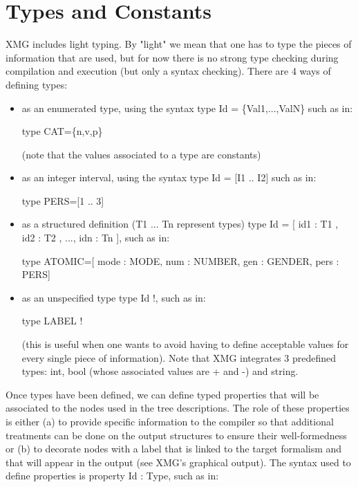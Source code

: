 \documentclass[11pt,fleqn]{book} %
\begin{document}
\section{Types and Constants}
XMG includes light typing. By "light" we mean that one has to type the pieces of information that are used, but for now there is no strong type checking during compilation and execution (but only a syntax checking). There are 4 ways of defining types:

\begin{itemize}
\item    as an enumerated type, using the syntax type Id = \{Val1,...,ValN\} such as in: 
\begin{theorem}
type CAT=\{n,v,p\}
\end{theorem}

(note that the values associated to a type are constants)

\item    as an integer interval, using the syntax type Id = [I1 .. I2] such as in: 
\begin{theorem}
type PERS=[1 .. 3]
\end{theorem}

\item    as a structured definition (T1 ... Tn represent types) type Id = [ id1 : T1 , id2 : T2 , ..., idn : Tn ], such as in: 
\begin{theorem}
type ATOMIC=[
     mode : MODE,
     num : NUMBER,
     gen : GENDER,
     pers : PERS]
\end{theorem}

\item    as an unspecified type type Id !, such as in: 
\begin{theorem}
type LABEL !
\end{theorem}

(this is useful when one wants to avoid having to define acceptable values for every single piece of information). Note that XMG integrates 3 predefined types: int, bool (whose associated values are + and -) and string.
\end{itemize}
Once types have been defined, we can define typed properties that will be associated to the nodes used in the tree descriptions. The role of these properties is either (a) to provide specific information to the compiler so that additional treatments can be done on the output structures to ensure their well-formedness or (b) to decorate nodes with a label that is linked to the target formalism and that will appear in the output (see XMG's graphical output). The syntax used to define properties is property Id : Type, such as in:
\end{document}
